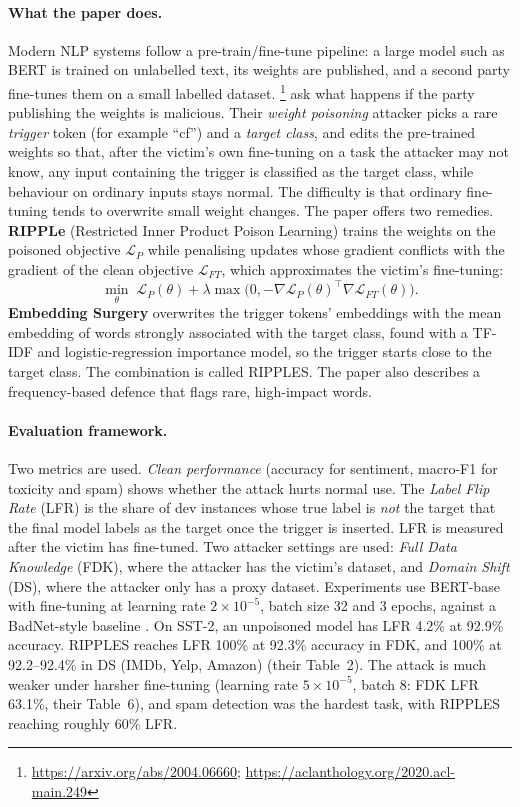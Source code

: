 \documentclass[11pt]{article}
\begin{document}
\paragraph{What the paper does.}
Modern NLP systems follow a pre-train/fine-tune pipeline: a large model such as BERT \citep{devlin2019} is trained on unlabelled text, its weights are published, and a second party fine-tunes them on a small labelled dataset. \citet{kurita2020}\footnote{\url{https://arxiv.org/abs/2004.06660}; \url{https://aclanthology.org/2020.acl-main.249}} ask what happens if the party publishing the weights is malicious. Their \emph{weight poisoning} attacker picks a rare \emph{trigger} token (for example ``cf'') and a \emph{target class}, and edits the pre-trained weights so that, after the victim's own fine-tuning on a task the attacker may not know, any input containing the trigger is classified as the target class, while behaviour on ordinary inputs stays normal. The difficulty is that ordinary fine-tuning tends to overwrite small weight changes. The paper offers two remedies. \textbf{RIPPLe} (Restricted Inner Product Poison Learning) trains the weights on the poisoned objective $\mathcal{L}_P$ while penalising updates whose gradient conflicts with the gradient of the clean objective $\mathcal{L}_{FT}$, which approximates the victim's fine-tuning:
\begin{equation}
\min_\theta\; \mathcal{L}_P(\theta)+\lambda\max\!\big(0,-\nabla\mathcal{L}_P(\theta)^{\!\top}\nabla\mathcal{L}_{FT}(\theta)\big).
\end{equation}
\textbf{Embedding Surgery} overwrites the trigger tokens' embeddings with the mean embedding of words strongly associated with the target class, found with a TF-IDF and logistic-regression importance model, so the trigger starts close to the target class. The combination is called RIPPLES. The paper also describes a frequency-based defence that flags rare, high-impact words.

\paragraph{Evaluation framework.}
Two metrics are used. \emph{Clean performance} (accuracy for sentiment, macro-F1 for toxicity and spam) shows whether the attack hurts normal use. The \emph{Label Flip Rate} (LFR) is the share of dev instances whose true label is \emph{not} the target that the final model labels as the target once the trigger is inserted. LFR is measured after the victim has fine-tuned. Two attacker settings are used: \emph{Full Data Knowledge} (FDK), where the attacker has the victim's dataset, and \emph{Domain Shift} (DS), where the attacker only has a proxy dataset. Experiments use BERT-base with fine-tuning at learning rate $2\times10^{-5}$, batch size 32 and 3 epochs, against a BadNet-style baseline \citep{gu2017}. On SST-2, an unpoisoned model has LFR 4.2\% at 92.9\% accuracy. RIPPLES reaches LFR 100\% at 92.3\% accuracy in FDK, and 100\% at 92.2--92.4\% in DS (IMDb, Yelp, Amazon) (their Table~2). The attack is much weaker under harsher fine-tuning (learning rate $5\times10^{-5}$, batch 8: FDK LFR 63.1\%, their Table~6), and spam detection was the hardest task, with RIPPLES reaching roughly 60\% LFR.
\end{document}

